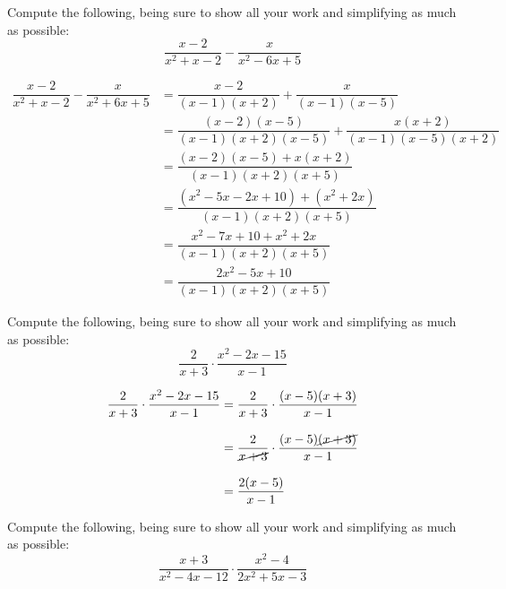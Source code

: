 \documentclass[11pt,letterpaper]{article}
\begin{document}
\newpage





 Compute the following, being sure to show all your work and simplifying as much as possible:
	\[
	\dfrac{x - 2}{x^2 + x - 2} - \dfrac{x}{x^2 - 6x + 5}
	\] \pspace

\sol
	\[
	\begin{aligned}
	\dfrac{x - 2}{x^2 + x - 2} - \dfrac{x}{x^2 + 6x + 5}&= \dfrac{x - 2}{(x - 1)(x + 2)} + \dfrac{x}{(x - 1)(x - 5)} \\[0.3cm]
	&= \dfrac{(x - 2)(x - 5)}{(x - 1)(x + 2)(x - 5)} + \dfrac{x(x + 2)}{(x - 1)(x - 5)(x + 2)} \\[0.3cm]
	&= \dfrac{(x - 2)(x - 5) + x(x + 2)}{(x - 1)(x + 2)(x + 5)} \\[0.3cm]
	&= \dfrac{(x^2 - 5x - 2x + 10) + (x^2 + 2x)}{(x - 1)(x + 2)(x + 5)} \\[0.3cm]
	&= \dfrac{x^2 - 7x + 10 + x^2 + 2x}{(x - 1)(x + 2)(x + 5)} \\[0.3cm]
	&= \dfrac{2x^2 - 5x + 10}{(x - 1)(x + 2)(x + 5)}
	\end{aligned}
	\]





\newpage





 Compute the following, being sure to show all your work and simplifying as much as possible:
	\[
	\dfrac{2}{x + 3} \cdot \dfrac{x^2 - 2x - 15}{x - 1}
	\] \pspace

\sol 
	\[
	\begin{aligned}
	\dfrac{2}{x + 3} \cdot \dfrac{x^2 - 2x - 15}{x - 1}&= \dfrac{2}{x + 3} \cdot \dfrac{(x - 5)(x + 3)}{x - 1} \\[0.3cm]
	&= \dfrac{2}{\cancel{x + 3}} \cdot \dfrac{(x - 5) \cancel{(x + 3)}}{x - 1} \\[0.3cm]
	&= \dfrac{2(x - 5)}{x - 1}
	\end{aligned}
	\]





\newpage





 Compute the following, being sure to show all your work and simplifying as much as possible:
	\[
	\dfrac{x + 3}{x^2 - 4x - 12} \cdot \dfrac{x^2 - 4}{2x^2 + 5x - 3}
	\] \pspace
\end{document}
